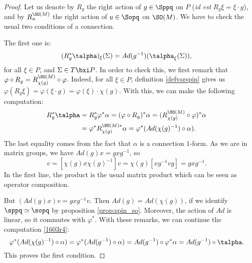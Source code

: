 \begin{proof}
Let us denote by $R_g$ the right action of $g\in\Sppq$ on $P$ (\emph{id est} $R_g\xi=\xi\cdot g$), and by $R_u^{\SO(M)}$ the right action of $u\in\Sopq$ on $\SO(M)$.
We  have to check the usual two conditions of a connection.

The first one is:
\[
            (R_g^*\talpha)_{\xi}(\Sigma)=Ad(g^{-1})(\talpha_{\xi}(\Sigma)),
\]
for all $\xi\in P$, and $\Sigma\in T\bxi P$. In order to check this, we first remark that $\varphi\circ R_g=R_{\chi(g)}^{\SO(M)}\circ\varphi$. Indeed, for all $\xi\in P$, definition \ref{defvarspin} gives us $\varphi(R_g\xi)=\varphi(\xi\cdot g)=\varphi(\xi)\cdot\chi(g)$.  With this, we can make the following computation:
\begin{equation}\label{1603r4}
\begin{aligned}
R_g^*\talpha&=R_g^*\varphi^*\alpha=(\varphi\circ   R_g)^*\alpha	=(R_{\chi(g)}^{\SO(M)}\circ\varphi)^*\alpha\\
            &=\varphi^*R_{\chi(g)}^{\SO(M)*}\alpha=\varphi^*(Ad(\chi(g)^{-1})\circ\alpha).
\end{aligned}
\end{equation}
The last equality comes from the fact that $\alpha$ is a connection $1$-form. As we are in matrix groups, we have $Ad(g)x=gxg^{-1}$, so
\begin{equation}
   [Ad(\chi(g))x]v=[\chi(g) x \chi(g)^{-1}]v
                  =\chi(g)[xg^{-1} vg]
                  =gxg^{-1}.
\end{equation}
In the first line, the product is the usual matrix product which can be seen as operator composition.

But $(Ad(g)x)v=gxg^{-1} v$. Then $Ad(g)=Ad(\chi(g))$, if we identify $\sppq\simeq\sopq$ by proposition \ref{prop:spin_so}. Moreover, the action of $Ad$ is linear, so it commutes with $\varphi^*$. With these remarks, we can continue the computation \eqref{1603r4}:
\begin{equation}
 \varphi^*(Ad(\chi(g)^{-1})\circ\alpha)=\varphi^*(Ad(g^{-1})\circ\alpha)
                                  =Ad(g^{-1})\circ\varphi^*\alpha
                                  =Ad(g^{-1})\circ\talpha.
\end{equation}
This proves the first condition.


\end{proof}

